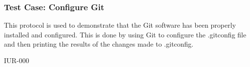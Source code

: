 \subsubsection{Test Case: Configure Git}
\begin{description}[align=right,leftmargin=3.2cm,labelindent=3.0cm]
\item[Purpose:] This protocol is used to demonstrate that the Git software has been properly installed and configured. This is done by using Git to configure the .gitconfig file and then printing the results of the changes made to .gitconfig.
\item[Requirement:] IUR-000
\end{description}
